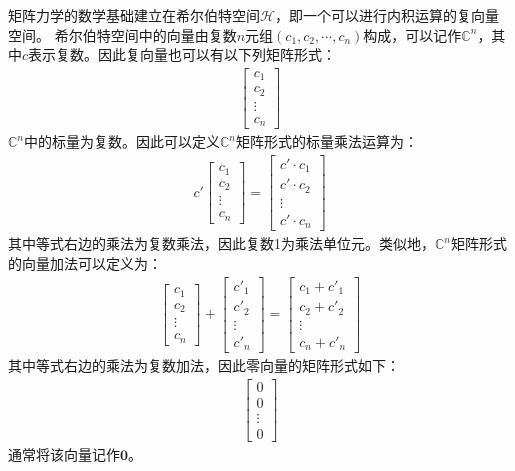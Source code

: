 矩阵力学的数学基础建立在希尔伯特空间\(\mathcal{H}\)，即一个可以进行内积运算的复向量空间。
希尔伯特空间中的向量由复数\(n\)元组\(\left(c_1,c_2,\cdots,c_n\right)\)构成，可以记作\(\mathbb{C}^n\)，其中\(c\)表示复数。因此复向量也可以有以下列矩阵形式：
\begin{align}
    \left[\begin{matrix}
        c_1\\c_2\\\vdots\\c_n
    \end{matrix}\right]
\end{align}
\(\mathbb{C}^n\)中的标量为复数。因此可以定义\(\mathbb{C}^n\)矩阵形式的标量乘法运算为：
\begin{align}
    c'\left[\begin{matrix}
        c_1\\c_2\\\vdots\\c_n
    \end{matrix}\right]=\left[\begin{matrix}
        c'\cdot c_1\\c'\cdot c_2\\\vdots\\c'\cdot c_n
    \end{matrix}\right]
\end{align}
其中等式右边的乘法为复数乘法，因此复数1为乘法单位元。类似地，\(\mathbb{C}^n\)矩阵形式的向量加法可以定义为：
\begin{align}
    \left[\begin{matrix}
        c_1\\c_2\\\vdots\\c_n
    \end{matrix}\right]
    +\left[\begin{matrix}
        c'_1\\c'_2\\\vdots\\c'_n
    \end{matrix}\right]=\left[\begin{matrix}
        c_1+c'_1\\c_2+c'_2\\\vdots\\c_n+c'_n
    \end{matrix}\right]
\end{align}
其中等式右边的乘法为复数加法，因此零向量的矩阵形式如下：
\begin{align}
    \left[\begin{matrix}
        0\\0\\\vdots\\0
    \end{matrix}\right]
\end{align}
通常将该向量记作\(\mathbf{0}\)。

